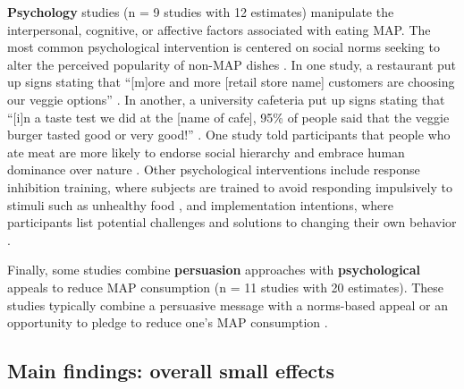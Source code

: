 \documentclass[preprint, 3p,
authoryear]{elsarticle} %
\begin{document}
\textbf{Psychology} studies
\citep{aldoh2023, allen2002, camp2019, coker2022, piester2020, sparkman2020}
(n = 9 studies with 12 estimates) manipulate the interpersonal,
cognitive, or affective factors associated with eating MAP. The most
common psychological intervention is centered on social norms seeking to
alter the perceived popularity of non-MAP dishes
\citep{sparkman2020, sparkman2021}. In one study, a restaurant put up
signs stating that ``{[}m{]}ore and more {[}retail store name{]}
customers are choosing our veggie options'' \citep{coker2022}. In
another, a university cafeteria put up signs stating that ``{[}i{]}n a
taste test we did at the {[}name of cafe{]}, 95\% of people said that
the veggie burger tasted good or very good!'' \citep{piester2020}. One
study told participants that people who ate meat are more likely to
endorse social hierarchy and embrace human dominance over nature
\citep{allen2002}. Other psychological interventions include response
inhibition training, where subjects are trained to avoid responding
impulsively to stimuli such as unhealthy food \citep{camp2019}, and
implementation intentions, where participants list potential challenges
and solutions to changing their own behavior
\citep{aberman2018, shreedhar2021}.

Finally, some studies combine \textbf{persuasion} approaches with
\textbf{psychological} appeals to reduce MAP consumption
\citep{aberman2018, berndsen2005, bertolaso2015, carfora2023, fehrenbach2015, hennessy2016, mathur2021effectiveness, mattson2020, piester2020, shreedhar2021}
(n = 11 studies with 20 estimates). These studies typically combine a
persuasive message with a norms-based appeal
\citep{piester2020, mattson2020} or an opportunity to pledge to reduce
one's MAP consumption \citep{mathur2021effectiveness, shreedhar2021}.

\subsection{Main findings: overall small effects}\label{Sec3.2}
\end{document}
